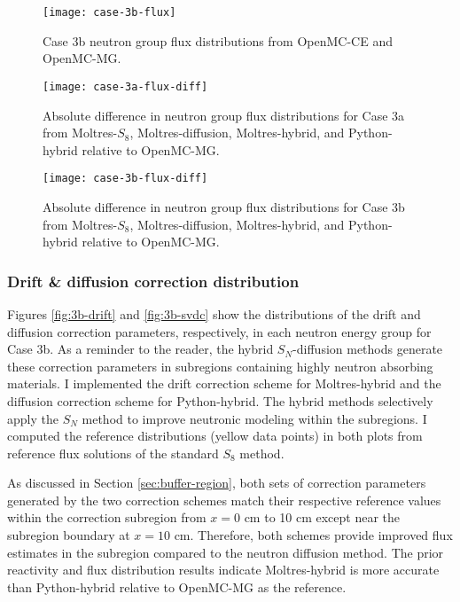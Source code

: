 \begin{figure}[htb!]
  \centering
  \texttt{[image: case-3b-flux]}
  \caption{Case 3b neutron group flux distributions from OpenMC-CE and OpenMC-MG.}
  \label{fig:3b-flux}
\end{figure}

\begin{figure}[htb!]
  \centering
  \texttt{[image: case-3a-flux-diff]}
  \caption{Absolute difference in neutron group flux distributions for Case 3a from Moltres-$S_8$,
  Moltres-diffusion, Moltres-hybrid, and Python-hybrid relative to OpenMC-MG.}
  \label{fig:3a-flux-diff}
\end{figure}

\begin{figure}[htb!]
  \centering
  \texttt{[image: case-3b-flux-diff]}
  \caption{Absolute difference in neutron group flux distributions for Case 3b from Moltres-$S_8$,
  Moltres-diffusion, Moltres-hybrid, and Python-hybrid relative to OpenMC-MG.}
  \label{fig:3b-flux-diff}
\end{figure}

\FloatBarrier

\subsubsection{Drift \& diffusion correction distribution}

Figures \ref{fig:3b-drift} and \ref{fig:3b-svdc} show the distributions of the drift and diffusion
correction parameters, respectively, in each neutron energy group for Case 3b. As a reminder to the
reader, the hybrid $S_N$-diffusion methods generate these correction parameters in subregions
containing highly neutron absorbing materials. I implemented the drift correction scheme for
Moltres-hybrid and the diffusion correction scheme for Python-hybrid. The hybrid methods
selectively apply the $S_N$ method to improve neutronic modeling within the subregions. I computed
the reference distributions (yellow data points) in both plots from reference flux solutions of the
standard $S_8$ method.

As discussed in Section \ref{sec:buffer-region}, both sets of correction parameters generated by
the two correction schemes match their respective reference values within the correction subregion
from $x=0$ cm to 10 cm except near the subregion boundary at $x=10$ cm. Therefore, both schemes
provide improved flux estimates in the subregion compared to the neutron diffusion method.
The prior reactivity and flux distribution results indicate Moltres-hybrid is more accurate
than Python-hybrid relative to OpenMC-MG as the reference.

